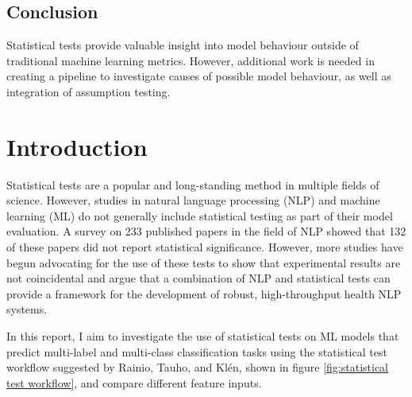 \documentclass[10.7pt, onecolumn]{article}
\begin{document}
\subsection{Conclusion}

Statistical tests provide valuable insight into model behaviour outside of traditional machine learning metrics. However, additional work is needed in creating a pipeline to investigate causes of possible model behaviour, as well as integration of assumption testing.

\section{Introduction}\label{introduction}
Statistical tests are a popular and long-standing method in multiple fields of science. However, studies in natural language processing (NLP) and machine learning (ML) do not generally include statistical testing as part of their model evaluation. A survey on 233 published papers in the field of NLP showed that 132 of these papers did not report statistical significance\cite{statsPaper}. However, more studies have begun advocating for the use of these tests to show that experimental results are not coincidental\cite{statsPaper} and argue that a combination of NLP and statistical tests can provide a framework for the development of robust, high-throughput health NLP systems\cite{10.1197/jamia.M3028}. 

In this report, I aim to investigate the use of statistical tests on ML models that predict multi-label and multi-class  classification tasks using the statistical test workflow suggested by Rainio, Tauho, and Klén\cite{statsBased}, shown in figure \ref{fig:statistical test workflow}, and compare different feature inputs.
\end{document}
